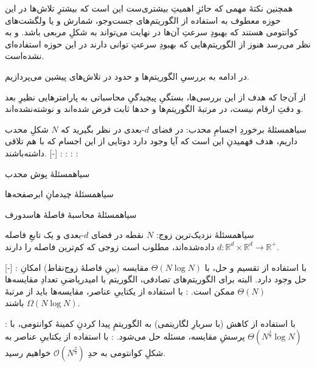 \documentclass[a4paper,12pt]{article}
\renewcommand{\O}[1]{\mathcal{O}(#1)}
\begin{document}
همچنین نکتهٔ مهمی که حائزِ اهمیتِ بیشتری‌ست این است که بیشترِ تلاش‌ها در این حوزه معطوف به استفاده از الگوریتم‌های جست‌وجو، شمارش و یا ولگشت‌های کوانتومی هستند که بهبودِ سرعتِ آن‌ها در نهایت می‌تواند به شکلِ مربعی  باشد. و به نظر می‌رسد هنوز از الگوریتم‌هایی که بهبودِ سرعتِ توانی
 دارند در این حوزه استفاده‌ای نشده‌است. 

در ادامه به بررسیِ الگوریتم‌ها و حدود در تلاش‌های پیشین می‌پردازیم.

از آن‌جا که هدف از این بررسی‌ها، بستگیِ پیچیدگیِ محاسباتی به پارامترهایی نظیرِ بعد و دقتِ ارقام نیست، در مرتبهٔ الگوریتم‌ها و حدها ثابت فرض شده‌اند و نوشته‌نشده‌اند.

‌سیاه{مسئلهٔ برخوردِ اجسامِ محدب}: در فضای $d$-بعدی در نظر بگیرید که $N$ شکلِ محدب داریم، هدف فهمیدنِ این است که آیا وجود دارد دوتایی از این اجسام که با هم تلاقی داشته‌باشند. 
[-]
:
:
:
:

‌سیاه{مسئلهٔ پوش محدب}

‌سیاه{مسئلهٔ چیدمانِ ابرصفحه‌ها}

‌سیاه{مسئلهٔ محاسبهٔ فاصلهٔ هاسدورف}


‌سیاه{مسئلهٔ نزدیک‌ترین زوج}: 
\(N\)
نقطه در فضای \(d\)-بعدی و یک تابعِ فاصله 
\(d: \mathbb{R}^d \times \mathbb{R}^d \to \mathbb{R}^+\)
داده‌شده‌اند، مطلوب است زوجی که کم‌ترین فاصله را دارند. 

[-]
: با استفاده از تقسیم و حل، با 
$\Theta(N \log N)$ 
مقایسه (بینِ فاصلهٔ زوج‌نقاط)
امکانِ حل وجود دارد.
البته برای الگوریتم‌های تصادفی، الگوریتم با امیدریاضیِ تعدادِ مقایسه‌ها
$\Theta(N)$
ممکن است.
: با استفاده از یکتاییِ عناصر، مقایسه‌ها باید از مرتبهٔ
$\Omega(N \log N)$
باشند.

: با استفاده از کاهش (با سربارِ لگاریتمی) به الگوریتمِ پیدا کردنِ کمینهٔ کوانتومی، با
$\Theta(N^{\frac{2}{3}} \log N)$
پرسشِ مقایسه، مسئله حل می‌شود.
: با استفاده از یکتاییِ عناصر به شکلِ کوانتومی به حدِ
$\O{N^{\frac{2}{3}}}$
خواهیم رسید.

\end{document}
